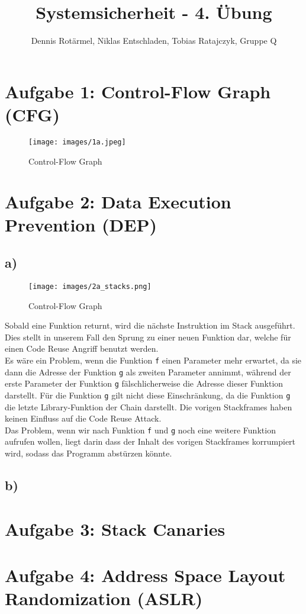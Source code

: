 \documentclass{article}
\title{Systemsicherheit - 4. Übung}
\author{Dennis Rotärmel, Niklas Entschladen, Tobias Ratajczyk, Gruppe Q}
\begin{document}
\maketitle
	
\newpage
\thispagestyle{empty}
\section{Aufgabe 1: Control-Flow Graph (CFG)}
\begin{figure}[h]
	\centering\texttt{[image: images/1a.jpeg]}
	\caption{Control-Flow Graph}
\end{figure}
\pagebreak
\section{Aufgabe 2: Data Execution Prevention (DEP)}
\subsection{a)}
\begin{figure}[h]
\centering\texttt{[image: images/2a\_stacks.png]}
\caption{Control-Flow Graph}
\end{figure}
Sobald eine Funktion returnt, wird die nächste Instruktion im Stack ausgeführt. Dies stellt in unserem Fall den Sprung zu einer neuen Funktion dar, welche für einen Code Reuse Angriff benutzt werden.\\
Es wäre ein Problem, wenn die Funktion \verb|f| einen Parameter mehr erwartet, da sie dann die Adresse der Funktion \verb|g| als zweiten Parameter annimmt, während der erste Parameter der Funktion \verb|g| fälschlicherweise die Adresse dieser Funktion darstellt. Für die Funktion \verb|g| gilt nicht diese Einschränkung, da die Funktion \verb|g| die letzte Library-Funktion der Chain darstellt. Die vorigen Stackframes haben keinen Einfluss auf die Code Reuse Attack.\\
Das Problem, wenn wir nach Funktion \verb|f| und \verb|g| noch eine weitere Funktion aufrufen wollen, liegt darin dass der Inhalt des vorigen Stackframes korrumpiert wird, sodass das Programm abstürzen könnte.
\subsection{b)}

\section{Aufgabe 3: Stack Canaries}
	
\section{Aufgabe 4: Address Space Layout Randomization (ASLR)}
	
\end{document}
